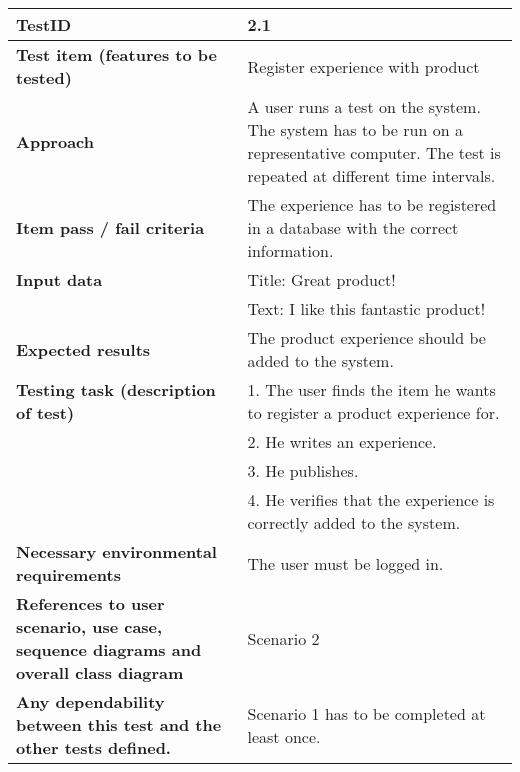 
\begin{table}
    \centering
	\begin{tabularx}{1.2\textwidth}{| p{5cm} | X |}
	\hline
	\textbf{TestID} 																& 2.1\\ \hline
	\textbf{Test item (features to be tested)} 											& Register experience with product\\ \hline
	\textbf{Approach} 															& A user runs a test on the system. The system has to be run on a representative computer. 
																			The test is repeated at different time intervals.\\ \hline
	\textbf{Item pass / fail criteria} 													& The experience has to be registered in a database with the correct information.\\ \hline
	\textbf{Input data} 															& Title: Great product!\\
																			& Text: I like this fantastic product!\\ \hline
	\textbf{Expected results}									 					& The product experience should be added to the system.\\ \hline
	\textbf{Testing task (description of test)} 											& 1. The user finds the item he wants to register a product experience for.\\
																			& 2. He writes an experience. \\
																			& 3. He publishes.\\
																			& 4. He verifies that the experience is correctly added to the system. \\ \hline
	\textbf{Necessary environmental requirements} 										& The user must be logged in.\\ \hline
	\textbf{References to user scenario, use case, sequence diagrams and overall class diagram} 		& Scenario 2\\ \hline
	\textbf{Any dependability between this test and the other tests defined.}		 				& Scenario 1 has to be completed at least once.\\ \hline
	\end{tabularx}
\end{table}

